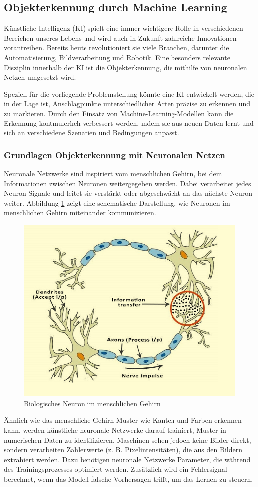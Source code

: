 \subsection{Objekterkennung durch Machine Learning}
Künstliche Intelligenz (KI) spielt eine immer wichtigere Rolle in verschiedenen Bereichen 
unseres Lebens und wird auch in Zukunft zahlreiche Innovationen vorantreiben. 
Bereits heute revolutioniert sie viele Branchen, darunter die Automatisierung, 
Bildverarbeitung und Robotik. Eine besonders relevante Disziplin innerhalb der KI ist die 
Objekterkennung, die mithilfe von neuronalen Netzen umgesetzt wird.

Speziell für die vorliegende Problemstellung könnte eine KI entwickelt werden, die in der 
Lage ist, Anschlagpunkte unterschiedlicher Arten präzise zu erkennen und zu markieren. 
Durch den Einsatz von Machine-Learning-Modellen kann die Erkennung kontinuierlich verbessert 
werden, indem sie aus neuen Daten lernt und sich an verschiedene Szenarien und Bedingungen 
anpasst.

\subsubsection{Grundlagen Objekterkennung mit Neuronalen Netzen}
Neuronale Netzwerke sind inspiriert vom menschlichen Gehirn, bei dem Informationen zwischen Neuronen weitergegeben 
werden. Dabei verarbeitet jedes Neuron Signale und leitet sie verstärkt oder abgeschwächt an das nächste Neuron weiter.
Abbildung \ref{fig:humanCell} zeigt eine schematische Darstellung, wie Neuronen im menschlichen Gehirn miteinander 
kommunizieren.

\begin{figure}[H]
    \centering
    \includegraphics[width=0.5\linewidth]{graphics/human_model.png}
    \caption{Biologisches Neuron im menschlichen Gehirn}
    \label{fig:humanCell}
\end{figure}

Ähnlich wie das menschliche Gehirn Muster wie Kanten und Farben erkennen kann, werden künstliche neuronale Netzwerke 
darauf trainiert, Muster in numerischen Daten zu identifizieren. Maschinen sehen jedoch keine Bilder direkt, sondern 
verarbeiten Zahlenwerte (z. B. Pixelintensitäten), die aus den Bildern extrahiert werden. Dazu benötigen neuronale 
Netzwerke Parameter, die während des Trainingsprozesses optimiert werden. Zusätzlich wird ein Fehlersignal berechnet, 
wenn das Modell falsche Vorhersagen trifft, um das Lernen zu steuern.

